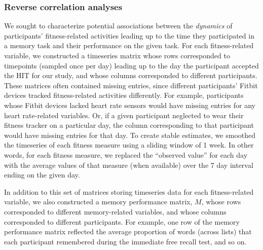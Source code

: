 \documentclass[10pt]{article}
\begin{document}
\subsubsection*{Reverse correlation analyses}
We sought to characterize potential associations between the \textit{dynamics}
of participants' fitness-related activities leading up to the time
they participated in a memory task and their performance on the given
task.  For each fitness-related variable, we constructed a timeseries
matrix whose rows corresponded to timepoints (sampled once per day)
leading up to the day the participant accepted the HIT for our study,
and whose columns corresponded to different participants.  These
matrices often contained missing entries, since different
participants' Fitbit devices tracked fitness-related activities
differently.  For example, participants whose Fitbit devices lacked
heart rate sensors would have missing entries for any heart
rate-related variables.  Or, if a given participant neglected to wear
their fitness tracker on a particular day, the column corresponding to
that participant would have missing entries for that day.  To create
stable estimates, we smoothed the timeseries of each fitness measure
using a sliding window of 1 week.  In other words, for each fitness
measure, we replaced the ``observed
value'' for each day with the average values of that measure (when
available) over the 7 day interval ending on the given day.

In addition to this set of matrices storing timeseries data for each
fitness-related variable, we also constructed a memory performance
matrix, $M$, whose rows corresponded to different memory-related
variables, and whose columns corresponded to different participants.
For example, one row of the memory performance matrix reflected the
average proportion of words (across lists) that each participant
remembered during the immediate free recall test, and so on.
\end{document}
